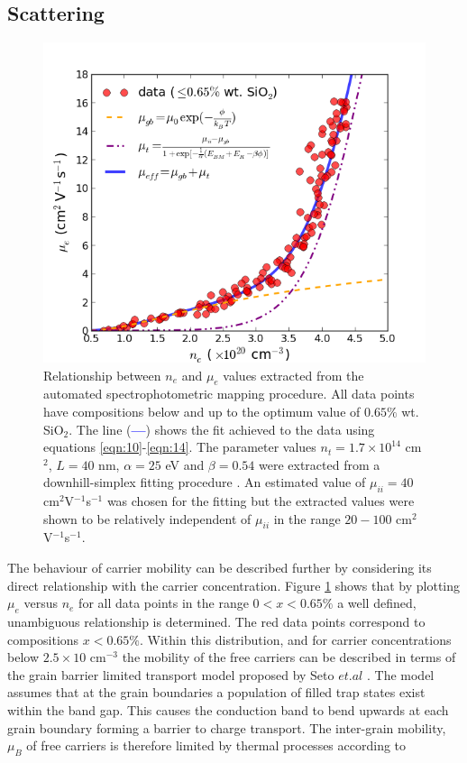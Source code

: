 \documentclass[final,5p,times]{elsarticle}
\begin{document}
\subsection{Scattering}
\label{sec:2.4}
\begin{figure}[ht]
\centering
\includegraphics[width = 1\columnwidth]{figure7.png}
\caption{\label{fig:7} Relationship between $n_e$ and $\mu_e$ values extracted from the automated spectrophotometric mapping procedure. All data points have compositions below and up to the optimum value of $0.65\%$ wt. SiO$_{2}$. The line (\textcolor{blue}{\textbf{---}}) shows the fit achieved to the data using equations \ref{eqn:10}-\ref{eqn:14}. The parameter values $n_t = 1.7\times10^{14}$ cm$^2$, $L = 40$ nm, $\alpha=25$ eV and $\beta = 0.54$ were extracted from a downhill-simplex fitting procedure \cite{Nelder1965}. An estimated value of $\mu_{ii} = 40$ cm$^2$V$^{-1}$s$^{-1}$ was chosen for the fitting but the extracted values were shown to be relatively independent of $\mu_{ii}$ in the range $20 - 100$ cm$^2$V$^{-1}$s$^{-1}$.}
\end{figure}
The behaviour of carrier mobility can be described further by considering its direct relationship with the carrier concentration. Figure \ref{fig:7} shows that by plotting $\mu_e$ versus $n_e$ for all data points in the range $0<x<0.65\%$ a well defined, unambiguous relationship is determined. The red data points correspond to compositions $x<0.65\%$. Within this distribution, and for carrier concentrations below $2.5\times10$ cm$^{-3}$ the mobility of the free carriers can be described in terms of the grain barrier limited transport  model proposed by  Seto $et. al$ \cite{Seto1975}. The model assumes that at the grain boundaries a population of filled trap states exist within the band gap. This causes the conduction band to bend upwards at each grain boundary forming a barrier to charge transport. The inter-grain mobility, $\mu_B$ of free carriers is therefore limited by thermal processes according to 
\end{document}
